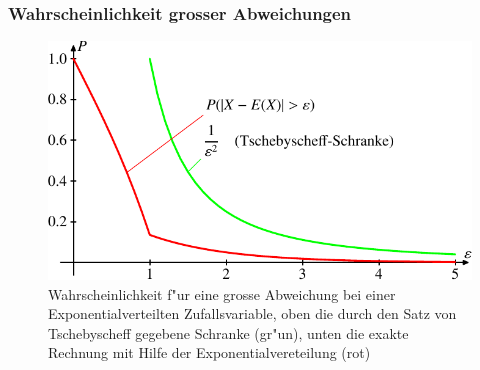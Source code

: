 \subsubsection{Wahrscheinlichkeit grosser Abweichungen}
\begin{figure}
\begin{center}
\includegraphics{images/exp-1.pdf}
\end{center}
\caption{Wahrscheinlichkeit f"ur eine grosse Abweichung bei einer
Exponentialverteilten Zufallsvariable, oben die durch den Satz von Tschebyscheff
gegebene Schranke (gr"un), unten die exakte Rechnung mit
Hilfe der Exponentialvereteilung (rot)\label{abweichung-exponential}}
\end{figure}

